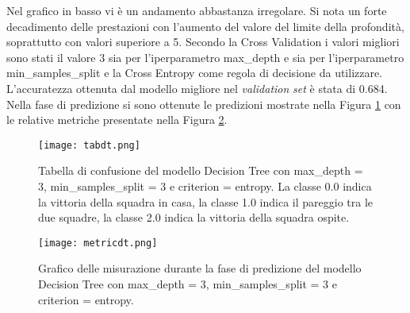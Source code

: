 Nel grafico in basso vi è un andamento abbastanza irregolare. Si nota un forte decadimento delle prestazioni con l'aumento del valore del limite della profondità, soprattutto con valori superiore a 5. Secondo la Cross Validation i valori migliori sono stati il valore 3 sia per l'iperparametro \textsf{max\_depth} e sia per l'iperparametro \textsf{min\_samples\_split} e la Cross Entropy come regola di decisione da utilizzare. L'accuratezza ottenuta dal modello migliore nel \emph{validation} \emph{set} è stata di 0.684.\\
Nella fase di predizione si sono ottenute le predizioni mostrate nella Figura \ref{fig:tabdt} con le relative metriche presentate nella Figura \ref{fig:dtmetrics}.
\begin{figure}[h]
	\begin{center}
		\texttt{[image: tabdt.png]}
		\caption{Tabella di confusione del modello Decision Tree con \textsf{max\_depth} = 3, \textsf{min\_samples\_split} = 3 e \textsf{criterion} = entropy. La classe 0.0 indica la vittoria della squadra in casa, la classe 1.0 indica il pareggio tra le due squadre, la classe 2.0 indica la vittoria della squadra ospite.
		} 
		\label{fig:tabdt}
	\end{center}
\end{figure}
\begin{figure}[]
	\begin{center}
		\texttt{[image: metricdt.png]}
		\caption{Grafico delle misurazione durante la fase di predizione del modello Decision Tree con \textsf{max\_depth} = 3, \textsf{min\_samples\_split} = 3 e \textsf{criterion} = entropy.
		} 
		\label{fig:dtmetrics}
	\end{center}
\end{figure}
